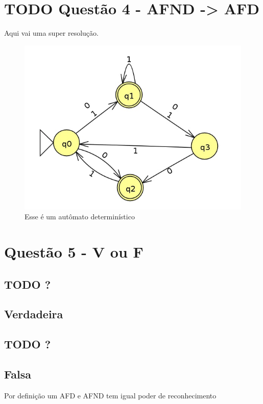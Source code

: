 \documentclass[11pt]{article}
\begin{document}
\section{{\bfseries\sffamily TODO} Questão 4 - AFND -> AFD}
\label{sec:org63e3b99}
Aqui vai uma super resolução.
\begin{figure}[htbp]
\centering
\includegraphics[width=.9\linewidth]{./q4/q4.jpg}
\caption{\label{fig:orgf489175}
Esse é um autômato determinístico}
\end{figure}
\section{Questão 5  - V ou F}
\label{sec:org64627ed}
\subsection{{\bfseries\sffamily TODO} ?}
\label{sec:orgb9614cb}
\subsection{Verdadeira}
\label{sec:org5f623e4}
\subsection{{\bfseries\sffamily TODO} ?}
\label{sec:org12ff4e8}
\subsection{Falsa}
\label{sec:org91d5166}
Por definição um AFD e AFND tem igual poder de reconhecimento
\end{document}
